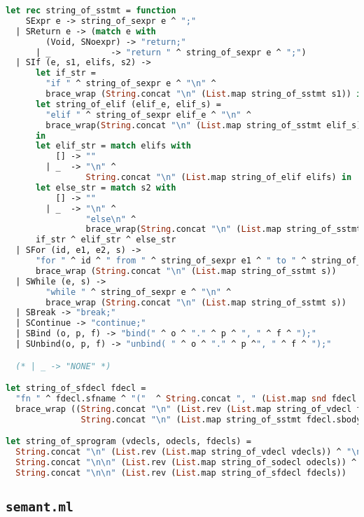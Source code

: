 \begin{lstlisting}[language=Caml,backgroundcolor=\color{backgroundcolor}]
let rec string_of_sstmt = function
    SExpr e -> string_of_sexpr e ^ ";"
  | SReturn e -> (match e with
        (Void, SNoexpr) -> "return;"
      | _            -> "return " ^ string_of_sexpr e ^ ";")
  | SIf (e, s1, elifs, s2) ->
      let if_str =
        "if " ^ string_of_sexpr e ^ "\n" ^
        brace_wrap (String.concat "\n" (List.map string_of_sstmt s1)) in
      let string_of_elif (elif_e, elif_s) = 
        "elif " ^ string_of_sexpr elif_e ^ "\n" ^
        brace_wrap(String.concat "\n" (List.map string_of_sstmt elif_s))
      in
      let elif_str = match elifs with 
          [] -> ""
        | _  -> "\n" ^
                String.concat "\n" (List.map string_of_elif elifs) in
      let else_str = match s2 with
          [] -> ""
        | _  -> "\n" ^
                "else\n" ^
                brace_wrap(String.concat "\n" (List.map string_of_sstmt s2)) in
      if_str ^ elif_str ^ else_str
  | SFor (id, e1, e2, s) ->
      "for " ^ id ^ " from " ^ string_of_sexpr e1 ^ " to " ^ string_of_sexpr e2 ^ "\n" ^
      brace_wrap (String.concat "\n" (List.map string_of_sstmt s))
  | SWhile (e, s) ->
        "while " ^ string_of_sexpr e ^ "\n" ^
        brace_wrap (String.concat "\n" (List.map string_of_sstmt s))
  | SBreak -> "break;"
  | SContinue -> "continue;"
  | SBind (o, p, f) -> "bind(" ^ o ^ "." ^ p ^ ", " ^ f ^ ");"
  | SUnbind(o, p, f) -> "unbind( " ^ o ^ "." ^ p ^", " ^ f ^ ");"

  (* | _ -> "NONE" *)

let string_of_sfdecl fdecl =
  "fn " ^ fdecl.sfname ^ "("  ^ String.concat ", " (List.map snd fdecl.sformals) ^ ") -> " ^ string_of_typ fdecl.styp ^ "\n" ^
  brace_wrap ((String.concat "\n" (List.rev (List.map string_of_vdecl fdecl.slocals))) ^ "\n\n" ^
               String.concat "\n" (List.map string_of_sstmt fdecl.sbody))

let string_of_sprogram (vdecls, odecls, fdecls) =
  String.concat "\n" (List.rev (List.map string_of_vdecl vdecls)) ^ "\n\n" ^
  String.concat "\n\n" (List.rev (List.map string_of_sodecl odecls)) ^ "\n\n" ^
  String.concat "\n\n" (List.rev (List.map string_of_sfdecl fdecls))
\end{lstlisting}

\subsection{\texttt{semant.ml}}

